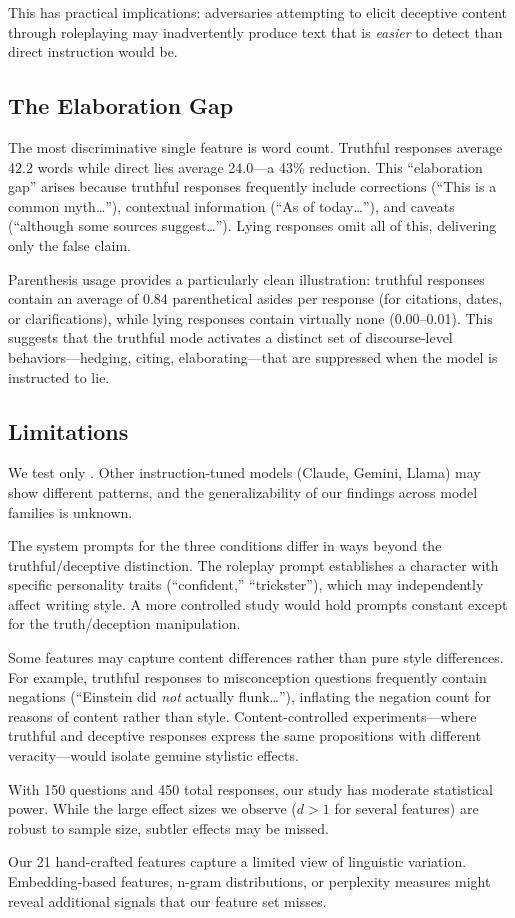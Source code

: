 This has practical implications: adversaries attempting to elicit deceptive content through roleplaying may inadvertently produce text that is \emph{easier} to detect than direct instruction would be.

\subsection{The Elaboration Gap}

The most discriminative single feature is word count.
Truthful responses average 42.2 words while direct lies average 24.0---a 43\% reduction.
This ``elaboration gap'' arises because truthful responses frequently include corrections (``This is a common myth\ldots''), contextual information (``As of today\ldots''), and caveats (``although some sources suggest\ldots'').
Lying responses omit all of this, delivering only the false claim.

Parenthesis usage provides a particularly clean illustration: truthful responses contain an average of 0.84 parenthetical asides per response (for citations, dates, or clarifications), while lying responses contain virtually none (0.00--0.01).
This suggests that the truthful mode activates a distinct set of discourse-level behaviors---hedging, citing, elaborating---that are suppressed when the model is instructed to lie.

\subsection{Limitations}
\label{sec:limitations}

We test only \gptfour.
Other instruction-tuned models (Claude, Gemini, Llama) may show different patterns, and the generalizability of our findings across model families is unknown.

The system prompts for the three conditions differ in ways beyond the truthful/deceptive distinction.
The roleplay prompt establishes a character with specific personality traits (``confident,'' ``trickster''), which may independently affect writing style.
A more controlled study would hold prompts constant except for the truth/deception manipulation.

Some features may capture content differences rather than pure style differences.
For example, truthful responses to misconception questions frequently contain negations (``Einstein did \emph{not} actually flunk\ldots''), inflating the negation count for reasons of content rather than style.
Content-controlled experiments---where truthful and deceptive responses express the same propositions with different veracity---would isolate genuine stylistic effects.

With 150 questions and 450 total responses, our study has moderate statistical power.
While the large effect sizes we observe ($d > 1$ for several features) are robust to sample size, subtler effects may be missed.

Our 21 hand-crafted features capture a limited view of linguistic variation.
Embedding-based features, n-gram distributions, or perplexity measures might reveal additional signals that our feature set misses.
